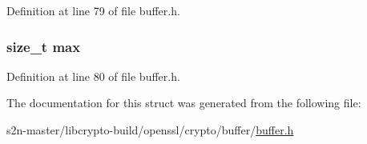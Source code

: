 Definition at line 79 of file buffer.\+h.

\subsubsection[{\texorpdfstring{max}{max}}]{\setlength{\rightskip}{0pt plus 5cm}size\+\_\+t max}\hypertarget{structbuf__mem__st_a2f9ce5f01c066eb6ef649c9a2b0dbf0e}{}\label{structbuf__mem__st_a2f9ce5f01c066eb6ef649c9a2b0dbf0e}


Definition at line 80 of file buffer.\+h.



The documentation for this struct was generated from the following file\+:\begin{DoxyCompactItemize}
\item 
s2n-\/master/libcrypto-\/build/openssl/crypto/buffer/\hyperlink{crypto_2buffer_2buffer_8h}{buffer.\+h}\end{DoxyCompactItemize}
